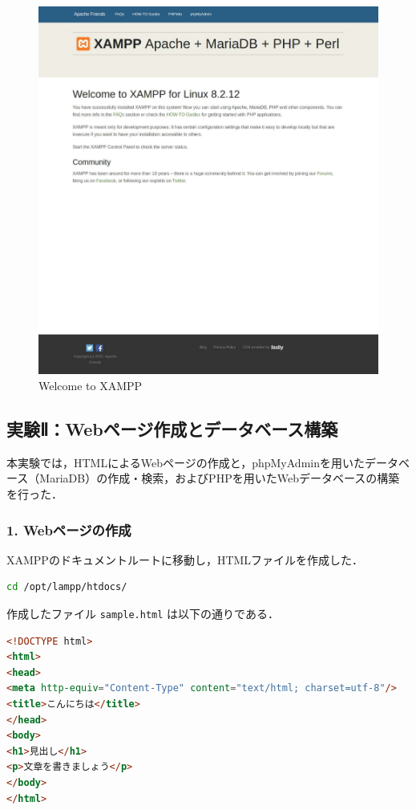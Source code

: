\begin{figure}[htbp]
  \centering
  \includegraphics[width=0.9\linewidth]{figure/1.pdf}
  \caption{Welcome to XAMPP}
\end{figure}

\subsection*{実験Ⅱ：Webページ作成とデータベース構築}

本実験では，HTMLによるWebページの作成と，phpMyAdminを用いたデータベース（MariaDB）の作成・検索，およびPHPを用いたWebデータベースの構築を行った．

\subsubsection*{1. Webページの作成}

XAMPPのドキュメントルートに移動し，HTMLファイルを作成した．

\begin{lstlisting}[language=bash]
cd /opt/lampp/htdocs/
\end{lstlisting}

作成したファイル \texttt{sample.html} は以下の通りである．

\begin{lstlisting}[language=html]
<!DOCTYPE html>
<html>
<head>
<meta http-equiv="Content-Type" content="text/html; charset=utf-8"/>
<title>こんにちは</title>
</head>
<body>
<h1>見出し</h1>
<p>文章を書きましょう</p>
</body>
</html>
\end{lstlisting}

